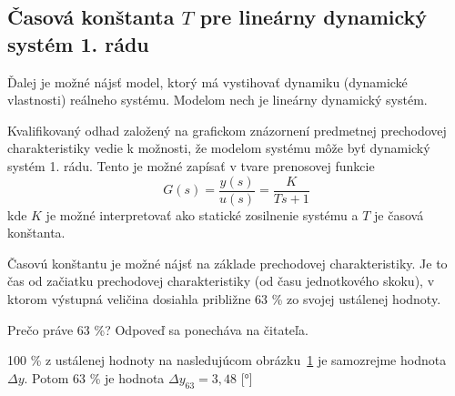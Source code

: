 \documentclass[a4paper, 10pt, ]{article}
\begin{document}
\subsection[Časová konštanta $T$ pre lineárny dynamický systém 1. rádu]{Časová konštanta $T$ pre lineárny dynamický systém 1. rádu}


Ďalej je možné nájsť model, ktorý má vystihovať dynamiku (dynamické vlastnosti) reálneho systému. Modelom nech je lineárny dynamický systém.

Kvalifikovaný odhad založený na grafickom znázornení predmetnej prechodovej charakteristiky vedie k možnosti, že modelom systému môže byť dynamický systém 1. rádu. Tento je možné zapísať v tvare prenosovej funkcie
\begin{equation}
    G(s) = \frac{y(s)}{u(s)} = \frac{K}{Ts+1}
\end{equation}
kde $K$ je možné interpretovať ako statické zosilnenie systému a $T$ je časová konštanta.

Časovú konštantu je možné nájsť na základe prechodovej charakteristiky. Je to čas od začiatku prechodovej charakteristiky (od času jednotkového skoku), v ktorom výstupná veličina dosiahla približne 63 \% zo svojej ustálenej hodnoty.

Prečo práve 63 \%? Odpoveď sa ponecháva na čitateľa.

100 \% z ustálenej hodnoty na nasledujúcom obrázku~\ref{graf30} je samozrejme hodnota $\Delta y$. Potom 63 \% je hodnota $\Delta y_{63} =  3,48$ [°]



\begin{figure}[t]
	\centering


    \vspace{-4mm}

	\caption{}
	\label{graf30}

\end{figure}
\end{document}
